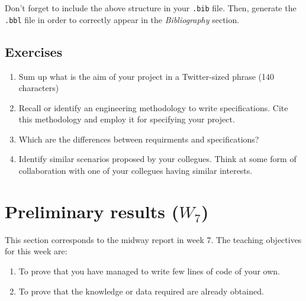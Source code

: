\documentclass[a4paper,12pt]{report}
\begin{document}
Don't forget to include the above structure in your \texttt{.bib} file. 
Then, generate the \texttt{.bbl} file in order to correctly appear in the \textit{Bibliography} section.

\section{Exercises}
\begin{enumerate}
\item Sum up what is the aim of your project in a Twitter-sized phrase (140 characters)
\item Recall or identify an engineering methodology to write specifications. 
 Cite this methodology and employ it for specifying your project.
 \item Which are the differences between requirments and specifications? 
 \item Identify similar scenarios proposed by your collegues. 
 Think at some form of collaboration with one of your collegues having similar interests.
\end{enumerate}

\vspace{0.5cm}

\vspace{0.5cm}

\vspace{0.5cm}

\vspace{0.5cm}



\chapter{Preliminary results ($W_7$)}
This section corresponds to the midway report in week 7.
The teaching objectives for this week are:
\begin{enumerate}
 \item To prove that you have managed to write few lines of code of your own.
\item To prove that the knowledge or data required are already obtained.
\end{enumerate}
\end{document}
